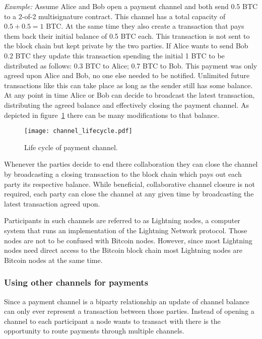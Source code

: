 \documentclass[final]{fhnwreport}       %
\begin{document}
\textit{Example:} Assume Alice and Bob open a payment channel and both send 0.5 BTC to a 2-of-2 multisignature contract. This channel has a total capacity of $0.5 + 0.5 = 1$ BTC. At the same time they also create a transaction that pays them back their initial balance of 0.5 BTC each. This transaction is not sent to the block chain but kept private by the two parties. If Alice wants to send Bob 0.2 BTC they update this transaction spending the initial 1 BTC to be distributed as follows: 0.3 BTC to Alice; 0.7 BTC to Bob. This payment was only agreed upon Alice and Bob, no one else needed to be notified. Unlimited future transactions like this can take place as long as the sender still has some balance. At any point in time Alice or Bob can decide to broadcast the latest transaction, distributing the agreed balance and effectively closing the payment channel. As depicted in figure~\ref{fig:ChannelCycle} there can be many modifications to that balance.

\begin{figure}[H]
\centering
\texttt{[image: channel\_lifecycle.pdf]}
\caption{Life cycle of payment channel.}
\label{fig:ChannelCycle}
\end{figure}

Whenever the parties decide to end there collaboration they can close the channel by broadcasting a closing transaction to the block chain which pays out each party its respective balance. While beneficial, collaborative channel closure is not required, each party can close the channel at any given time by broadcasting the latest transaction agreed upon. 

Participants in such channels are referred to as Lightning nodes, a computer system that runs an implementation of the Lightning Network protocol. Those nodes are not to be confused with Bitcoin nodes. However, since most Lightning nodes need direct access to the Bitcoin block chain most Lightning nodes are Bitcoin nodes at the same time.

\subsubsection{Using other channels for payments}
Since a payment channel is a biparty relationship an update of channel balance can only ever represent a transaction between those parties. Instead of opening a channel to each participant a node wants to transact with there is the opportunity to route payments through multiple channels.
\end{document}
